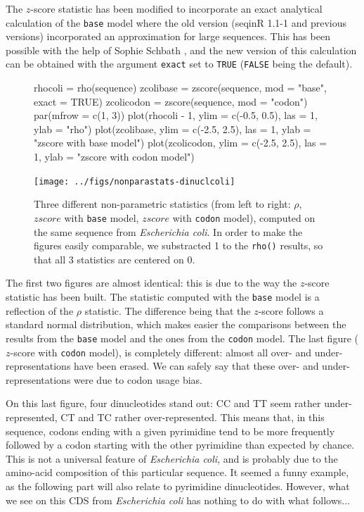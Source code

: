\documentclass{article}
\begin{document}
The $z$-score statistic has been modified to incorporate an exact
analytical calculation of the \texttt{base} model where the old 
version (seqinR 1.1-1 and previous versions) incorporated an
approximation for large sequences. This has been possible with the
help of Sophie Schbath \cite{Schbath-thesis}, and the new version of
this calculation can be obtained with the argument \texttt{exact} 
set to \texttt{TRUE} (\texttt{FALSE} being the default).

\begin{figure}[H]
  \begin{center}
\begin{Schunk}
\begin{Sinput}
 rhocoli = rho(sequence)
 zcolibase = zscore(sequence, mod = "base", exact = TRUE)
 zcolicodon = zscore(sequence, mod = "codon")
 par(mfrow = c(1, 3))
 plot(rhocoli - 1, ylim = c(-0.5, 0.5), las = 1, ylab = "rho")
 plot(zcolibase, ylim = c(-2.5, 2.5), las = 1, ylab = "zscore with base model")
 plot(zcolicodon, ylim = c(-2.5, 2.5), las = 1, ylab = "zscore with codon model")
\end{Sinput}
\end{Schunk}
\texttt{[image: ../figs/nonparastats-dinuclcoli]}
\end{center}
   \caption{Three different non-parametric statistics (from left to
   right: $\rho$, $zscore$ with \texttt{base} model, $zscore$ with
   \texttt{codon} model), computed on the same sequence from
   \textit{Escherichia coli}. In order to make the figures easily
   comparable, we substracted 1 to the \texttt{rho()} results, so that
   all 3 statistics are centered on 0. }
\label{dinuclcoli}
\end{figure}

The first two figures are almost identical: this is due to the way the
$z$-score statistic has been built. The statistic computed with
the \texttt{base} model is a reflection of the $\rho$ statistic. The
difference being that the $z$-score follows a standard normal
distribution, which makes easier the comparisons between the results
from the \texttt{base} model and the ones from the \texttt{codon}
model. The last figure ($z$-score with \texttt{codon} model), is
completely different: almost all over- and under-representations have
been erased. We can safely say that these over- and
under-representations were due to codon usage bias.

On this last figure, four dinucleotides stand out: CC and TT seem
rather under-represented, CT and TC rather over-represented. This
means that, in this sequence, codons ending with a given pyrimidine
tend to be more frequently followed by a codon starting with the other
pyrimidine than expected by chance. This is not a universal feature of
\textit{Escherichia coli}, and is probably due to the amino-acid
composition of this particular sequence. It seemed a funny example, as
the following part will also relate to pyrimidine dinucleotides.
However, what we see on this CDS from \textit{Escherichia coli} has
nothing to do with what follows...
\end{document}
